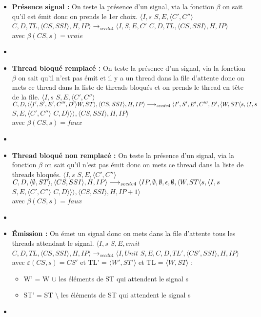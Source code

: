 \documentclass[10pt,a4paper]{article}
\begin{document}
\begin{enumerate}
\begin{itemize}
						\item[] \textbf{Présence signal :} On teste la présence d'un signal, via la fonction $\beta$ on sait qu'il est émit donc on prends le 1er choix.
						\smallbreak
						$\langle I,s$ $S,E,\langle C',C''\rangle$ $C,D,TL,\langle CS,SSI\rangle,H,IP\rangle 
						\longrightarrow_{secdv4} \langle I,S,E,C'$ $C,D,TL,\langle CS,SSI\rangle,H,IP\rangle$ \\
						avec $\beta(CS,s) = vraie$
						\item[]
							
							
						\item[] \textbf{ Thread bloqué remplacé :} On teste la présence d'un signal, via la fonction $\beta$ on sait qu'il n'est pas émit et il y a un thread dans la file d'attente
						donc on mets ce thread dans la liste de threads bloqués et on prends le thread en tête de la file.
						\smallbreak
						$\langle I,s$ $S,E,\langle C',C''\rangle$ $C,D,\langle\langle I',S',E',C''',D'\rangle W,ST\rangle,\langle CS,SSI\rangle,H,IP\rangle 
						\\\longrightarrow_{secdv4} \langle I',S',E',C''',D',\langle W,ST\langle s,\langle I,s$ $S,E,\langle C',C''\rangle$ $C,D\rangle\rangle\rangle,\langle CS,SSI\rangle,H,IP\rangle$ \\
						avec $\beta(CS,s) = faux$
						\item[]	
							
						\item[] \textbf{Thread bloqué non remplacé :} On teste la présence d'un signal, via la fonction $\beta$ on sait qu'il n'est pas émit donc on mets ce thread dans la liste de threads bloqués.
						\smallbreak 
						$\langle I,s$ $S,E,\langle C',C''\rangle$ $C,D,\langle \emptyset,ST\rangle,\langle CS,SSI\rangle,H,IP\rangle 
						\\\longrightarrow_{secdv4} \langle IP,\emptyset,\emptyset,\epsilon,\emptyset,\langle W,ST\langle s,\langle I,s$ $S,E,\langle C',C''\rangle$ $C,D\rangle\rangle\rangle,\langle CS,SSI\rangle,H,IP+1\rangle$ \\
						avec $\beta(CS,s) = faux$
						\item[]	
						\newpage
						
						
						
						\item[] \textbf{Émission :} On émet un signal donc on mets dans la file d'attente tous les threads attendant le signal.
						\smallbreak
						$\langle I,s$ $S,E,emit$ $C,D,TL,\langle CS,SSI\rangle,H,IP\rangle 
						\longrightarrow_{secdv4} \langle I,Unit$ $S,E,C,D,TL',\langle CS',SSI\rangle,H,IP\rangle$\\
						avec $\varepsilon(CS,s) = CS'$ et TL' = $\langle W',ST'\rangle$ et TL = $\langle W,ST\rangle$ :
						\begin{itemize}
							\item[] W' = W $\cup$ les éléments de ST qui attendent le signal s 
							\item[] ST' = ST $\setminus$ les éléments de ST qui attendent le signal s 
						\end{itemize}
						\item[]
						

\end{itemize}
\end{enumerate}
\end{document}
